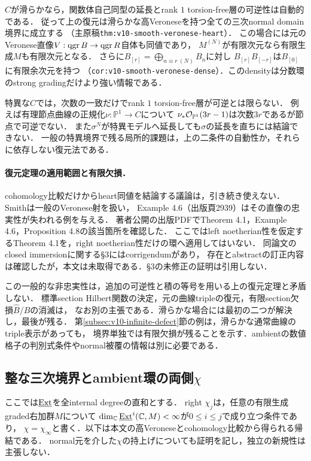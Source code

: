 \documentclass[11pt,a4paper]{ltjsarticle}
\begin{document}
$C$が滑らかなら，関数体自己同型の延長とrank $1$ torsion-free層の可逆性は自動的である．
従って上の復元は滑らかな高Veroneseを持つ全ての三次normal domain境界に成立する
（主原稿\texttt{thm:v10-smooth-veronese-heart}）．
この場合には元のVeronese直像$V:\operatorname{qgr} B\to\operatorname{qgr} R$自体も同値であり，
$M^{(N)}$が有限次元なら有限生成$M$も有限次元となる．
さらに$B_{[r]}=\bigoplus_{n\equiv r\ (N)}B_n$に対し
$B_{[r]}B_{[-r]}$は$B_{[0]}$に有限余次元を持つ
（\texttt{cor:v10-smooth-veronese-dense}）．このdensityは分数環のstrong gradingだけより強い情報である．

特異な$C$では，次数の一致だけでrank $1$ torsion-free層が可逆とは限らない．
例えば有理節点曲線の正規化$\nu:\mathbb P^1\to C$について
$\nu_*\mathcal O_{\mathbb P^1}(3r-1)$は次数$3r$であるが節点で可逆でない．
また$\sigma^N$が特異モデルへ延長しても$\sigma$の延長を直ちには結論できない．
一般の特異境界で残る局所的課題は，上の二条件の自動性か，それらに依存しない復元法である．

\paragraph{復元定理の適用範囲と有限欠損．}
cohomology比較だけからheart同値を結論する議論は，引き続き使えない．
Smith\cite[\S4]{SmithMaps}は一般のVeronese射を扱い，
Example 4.6（出版頁2939）はその直像の忠実性が失われる例を与える．
著者公開の出版PDFでTheorem 4.1，Example 4.6，Proposition 4.8の該当箇所を確認した．
ここではleft noetherian性を仮定するTheorem 4.1を，right noetherian性だけの環へ適用してはいない．
同論文のclosed immersionに関する\S3にはcorrigendum\cite{SmithCorr}があり，
存在とabstractの訂正内容は確認したが，本文は未取得である．\S3の未修正の証明は引用しない．

この一般的な非忠実性は，追加の可逆性と積の等号を用いる上の復元定理と矛盾しない．
標準section Hilbert関数の決定，元の曲線tripleの復元，有限section欠損$\widehat B/B$の消滅は，
なお別の主張である．滑らかな場合には最初の二つが解決し，最後が残る．
第\ref{subsec:v10-infinite-defect}節の例は，滑らかな通常曲線のtriple表示があっても，
境界単独では有限欠損が残ることを示す．ambientの数値格子の判別式条件やnormal被覆の情報は別に必要である．

\subsection{整な三次境界とambient環の両側\texorpdfstring{$\chi$}{chi}}

ここでは$\underline{\operatorname{Ext}}$を全internal degreeの直和とする．
right $\chi_j$は，任意の有限生成graded右加群$M$について
$\dim_\mathbb C\underline{\operatorname{Ext}}^i(\mathbb C,M)<\infty$が$0\le i\le j$で成り立つ条件であり，
$\chi=\chi_\infty$と書く．以下は本文の高Veroneseとcohomology比較から得られる帰結である．
normal元を介した$\chi$の持上げについても証明を記し，独立の新規性は主張しない．
\end{document}
